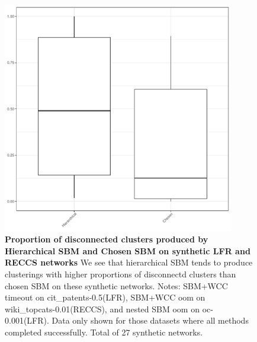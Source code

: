 \documentclass[aps,pre,superscriptaddress]{article}
\begin{document}
\begin{figure}[!htpb]
	\centering
	\includegraphics[width=0.9\textwidth]{figures/conn_box.pdf}
	\caption[]{\textbf{Proportion of disconnected clusters produced by Hierarchical SBM and Chosen SBM on synthetic LFR and RECCS networks}  We see that hierarchical SBM tends to produce clusterings with higher proportions of disconnectd clusters than chosen SBM on these synthetic networks. Notes: SBM+WCC timeout on cit\_patents-0.5(LFR), SBM+WCC oom on wiki\_topcats-0.01(RECCS), and nested SBM oom on oc-0.001(LFR). Data only shown for those datasets where all methods completed successfully. Total of 27 synthetic networks.}
	\label{fig:synthetic-connectivity}
\end{figure}
\end{document}
